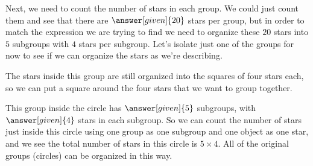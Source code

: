 \documentclass{ximera}
\begin{document}
\begin{example}
\begin{image}
\end{image}
Next, we need to count the number of stars in each group. We could just count them and see that there are $\answer[given]{20}$ stars per group, but in order to match the expression we are trying to find we need to organize these $20$ stars into $5$ subgroups with $4$ stars per subgroup. Let's isolate just one of the groups for now to see if we can organize the stars as we're describing.
\begin{image}
\end{image}
The stars inside this group are still organized into the squares of four stars each, so we can put a square around the four stars that we want to group together.

\begin{image}
\end{image}
This group inside the circle has $\answer[given]{5}$ subgroups, with $\answer[given]{4}$ stars in each subgroup. So we can count the number of stars just inside this circle using one group as one subgroup and one object as one star, and we see the total number of stars in this circle is $5 \times 4$. All of the original groups (circles) can be organized in this way.


\end{example}
\end{document}
